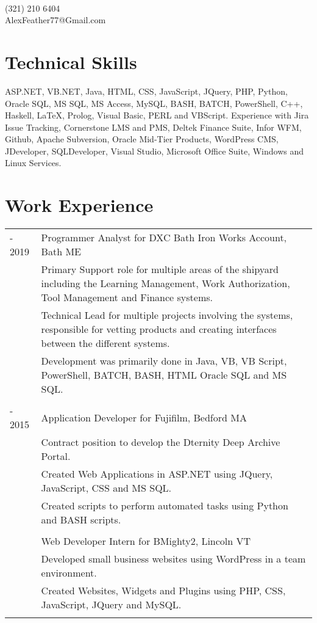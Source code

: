 \documentclass[12pt]{article}
\begin{document}
\pagestyle{empty}
\selectfont

{\\
\vspace{0.1cm}(321) 210 6404\\\vspace{0.1cm}AlexFeather77@Gmail.com\\}
\vspace{0.4cm}

\section*{\selectfont Technical Skills}
\small{ASP.NET, VB.NET, Java, HTML, CSS, JavaScript, JQuery, PHP, Python, Oracle SQL, MS SQL, MS Access, MySQL, BASH, BATCH, PowerShell, C++, Haskell, \LaTeX, Prolog, Visual Basic, PERL and VBScript. Experience with Jira Issue Tracking, Cornerstone LMS and PMS, Deltek Finance Suite, Infor WFM, Github, Apache Subversion, Oracle Mid-Tier Products, WordPress CMS, JDeveloper, SQLDeveloper, Visual Studio, Microsoft Office Suite, Windows and Linux Services.}

\section*{\selectfont Work Experience}
\begin{tabular}{p{2.3cm}|p{15.4cm}}
	\centering 2015 - 2019 & Programmer Analyst for DXC Bath Iron Works Account, Bath ME\\&\small{Primary Support role for multiple areas of the shipyard including the Learning Management, Work Authorization, Tool Management and Finance systems.}\\&\small{Technical Lead for multiple projects involving the systems, responsible for vetting products and creating interfaces between the different systems.}\\&\small{Development was primarily done in Java, VB, VB Script, PowerShell, BATCH, BASH, HTML Oracle SQL and MS SQL.}
	\\\multicolumn{2}{c}{} \\
	\centering 2014 - 2015 & Application Developer for Fujifilm, Bedford MA\\&\small{Contract position to develop the Dternity Deep Archive Portal.}\\&\small{Created Web Applications in ASP.NET using JQuery, JavaScript, CSS and MS SQL.}\\&\small{Created scripts to perform automated tasks using Python and BASH scripts.}
	\\\multicolumn{2}{c}{} \\
	\centering 2013 & Web Developer Intern for BMighty2, Lincoln VT\\&\small{Developed small business websites using WordPress in a team environment.}\\&\small{Created Websites, Widgets and Plugins using PHP, CSS, JavaScript, JQuery and MySQL.}\\\multicolumn{2}{c}{} \\
\end{tabular}
\end{document}

